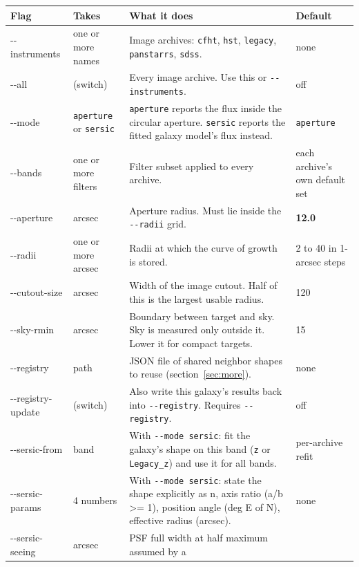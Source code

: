\documentclass[11pt]{article}
\begin{document}
\begin{longtable}{T{2.9cm} L{2.15cm} L{6.45cm} L{2.7cm}}
\toprule
\textbf{\normalfont Flag} & \textbf{Takes} & \textbf{What it does} & \textbf{Default} \\
\midrule
\endhead
-{}-instruments & one or more names & Image archives: \texttt{cfht},
  \texttt{hst}, \texttt{legacy}, \texttt{panstarrs}, \texttt{sdss}. &
  none \\[2pt]
-{}-all & (switch) & Every image archive. Use this or
  \texttt{-{}-instruments}. & off \\[2pt]
-{}-mode & \texttt{aperture} or \texttt{sersic} & \texttt{aperture}
  reports the flux inside the circular aperture. \texttt{sersic} reports
  the fitted galaxy model's flux instead. & \texttt{aperture} \\[2pt]
-{}-bands & one or more filters & Filter subset applied to every archive.
  & each archive's own default set \\[2pt]
-{}-aperture & arcsec & Aperture radius. Must lie inside the
  \texttt{-{}-radii} grid. & \textbf{12.0} \\[2pt]
-{}-radii & one or more arcsec & Radii at which the curve of growth is
  stored. & 2 to 40 in 1-arcsec steps \\[2pt]
-{}-cutout-size & arcsec & Width of the image cutout. Half of this is the
  largest usable radius. & 120 \\[2pt]
-{}-sky-rmin & arcsec & Boundary between target and sky. Sky is measured
  only outside it. Lower it for compact targets. & 15 \\[2pt]
-{}-registry & path & JSON file of shared neighbor shapes to reuse
  (section~\ref{sec:more}). & none \\[2pt]
-{}-registry-\newline update & (switch) & Also write this galaxy's results
  back into \texttt{-{}-registry}. Requires \texttt{-{}-registry}. &
  off \\[2pt]
-{}-sersic-from & band & With \texttt{-{}-mode sersic}: fit the galaxy's
  shape on this band (\texttt{z} or \texttt{Legacy\_z}) and use it for all
  bands. & per-archive refit \\[2pt]
-{}-sersic-\newline params & 4 numbers & With \texttt{-{}-mode sersic}: state the
  shape explicitly as n, axis ratio (a/b >= 1), position angle (deg E of
  N), effective radius (arcsec). & none \\[2pt]
-{}-sersic-\newline seeing & arcsec & PSF full width at half maximum assumed by a

\end{longtable}
\end{document}
